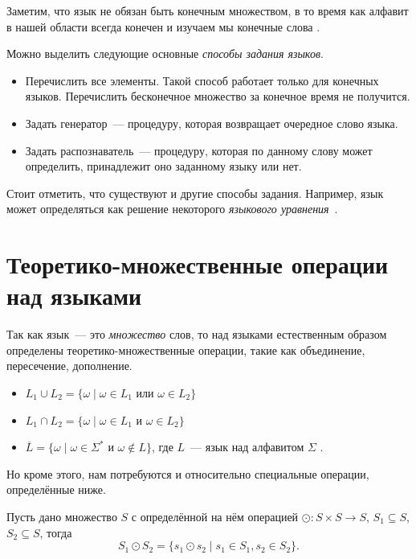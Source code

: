 Заметим, что язык не обязан быть конечным множеством, в то время как алфавит в нашей области всегда конечен%
и изучаем мы конечные слова%
.

Можно выделить следующие основные \emph{способы задания языков}.
\begin{itemize}
    \item Перечислить все элементы.
          Такой способ работает только для конечных языков.
          Перечислить бесконечное множество за конечное время не получится.
    \item Задать генератор~--- процедуру, которая возвращает очередное слово языка.
    \item Задать распознаватель~--- процедуру, которая по данному слову может определить, принадлежит оно заданному языку или нет.
\end{itemize}

Стоит отметить, что существуют и другие способы задания.
Например, язык может определяться как решение некоторого \emph{языкового уравнения}~.

\section{Теоретико-множественные операции над языками}

Так как язык~--- это \emph{множество} слов, то над языками естественным образом определены теоретико-множественные операции, такие как объединение, пересечение, дополнение.
\begin{itemize}
    \item $L_1 \cup L_2 = \{ \omega \mid \omega \in L_1 \text{ или } \omega \in L_2\}$
    \item $L_1 \cap L_2 = \{ \omega \mid \omega \in L_1 \text{ и } \omega \in L_2\}$
    \item $\overline{L} = \{ \omega \mid \omega \in \Sigma^* \text{ и } \omega \notin L\}$, где $L$~--- язык над алфавитом $\Sigma$ .
\end{itemize}

Но кроме этого, нам потребуются и относительно специальные операции, определённые ниже.

\begin{definition}
    Пусть дано множество $S$ с определённой на нём операцией $\odot: S \times S \to S$, $S_1 \subseteq S$, $S_2 \subseteq S$, тогда
    \[S_1 \odot S_2 = \{ s_1 \odot s_2 \mid s_1 \in S_1, s_2 \in S_2\}.\]
\end{definition}

